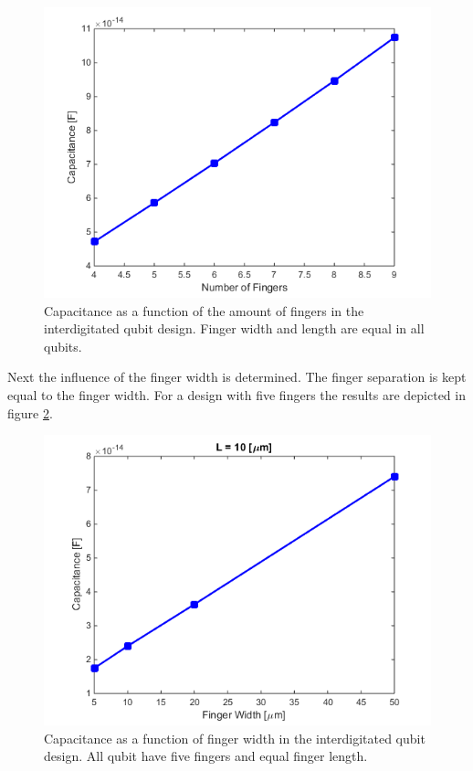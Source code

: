 \begin{figure}
	\centering
	\includegraphics[scale = 0.7]{Figures/Capacitance_Plots/CapVSFingers.png}
	\caption{Capacitance as a function of the amount of fingers in the interdigitated qubit design. Finger width and length are equal in all qubits.}
	\label{fig:CapVSFingers}
\end{figure}

Next the influence of the finger width is determined. The finger separation is kept equal to the finger width. For a design with five fingers the results are depicted in figure \ref{fig:CapVSWidthL10}. \\

\begin{figure}
	\centering
	\includegraphics[scale = 0.7]{Figures/Capacitance_Plots/CapVSWidthL10.png}
	\caption{Capacitance as a function of finger width in the interdigitated qubit design. All qubit have five fingers and equal finger length.}
	\label{fig:CapVSWidthL10}
\end{figure}

